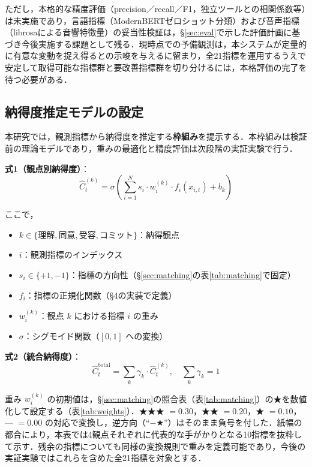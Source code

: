 \documentclass[Japanese]{dicomopapers}
\begin{document}
ただし，本格的な精度評価（precision／recall／F1，独立ツールとの相関係数等）は未実施であり，言語指標（ModernBERTゼロショット分類）および音声指標（librosaによる音響特徴量）の妥当性検証は，\S\ref{sec:eval}で示した評価計画に基づき今後実施する課題として残る．現時点での予備観測は，本システムが定量的に有意な変動を捉え得るとの示唆を与えるに留まり，全21指標を運用するうえで安定して取得可能な指標群と要改善指標群を切り分けるには，本格評価の完了を待つ必要がある．

\subsection{納得度推定モデルの設定}

本研究では，観測指標から納得度を推定する\textbf{枠組み}を提示する．本枠組みは検証前の理論モデルであり，重みの最適化と精度評価は次段階の実証実験で行う．

\textbf{式1（観点別納得度）}：
\begin{equation}
\hat{C}^{(k)}_{t} = \sigma\!\left(\sum_{i=1}^{N} s_i \cdot w_i^{(k)} \cdot f_i(x_{i,t}) + b_k\right)
\label{eq:perspective}
\end{equation}

ここで，
\begin{itemize}
\setlength{\itemsep}{0pt}
\item $k \in \{\mbox{理解}, \mbox{同意}, \mbox{受容}, \mbox{コミット}\}$：納得観点
\item $i$：観測指標のインデックス
\item $s_i \in \{+1, -1\}$：指標の方向性（\S\ref{sec:matching}の表\ref{tab:matching}で固定）
\item $f_i$：指標の正規化関数（\S4の実装で定義）
\item $w_i^{(k)}$：観点 $k$ における指標 $i$ の重み
\item $\sigma$：シグモイド関数（$[0,1]$ への変換）
\end{itemize}

\textbf{式2（統合納得度）}：
\begin{equation}
\hat{C}^{\mathrm{total}}_{t} = \sum_{k} \gamma_k \cdot \hat{C}^{(k)}_{t}, \quad \sum_{k} \gamma_k = 1
\label{eq:total}
\end{equation}

重み $w_i^{(k)}$ の初期値は，\S\ref{sec:matching}の照合表（表\ref{tab:matching}）の★を数値化して設定する（表\ref{tab:weights}）．★★★ $=0.30$，★★ $=0.20$，★ $=0.10$，--- $=0.00$ の対応で変換し，逆方向（``$-$★''）はそのまま負号を付した．紙幅の都合により，本表では4観点それぞれに代表的な手がかりとなる10指標を抜粋して示す．残余の指標についても同様の変換規則で重みを定義可能であり，今後の実証実験ではこれらを含めた全21指標を対象とする．
\end{document}
